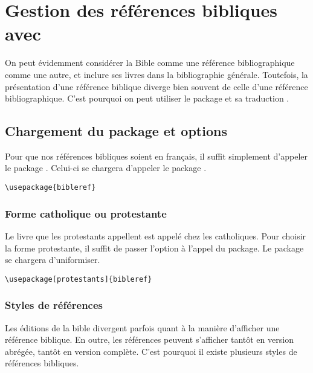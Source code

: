 \chapter{Gestion des références bibliques avec }

\begin{prealable}

On peut évidemment considérer la Bible comme une référence bibliographique comme une autre, et inclure ses livres dans la bibliographie générale.
Toutefois, la présentation d'une référence biblique diverge bien souvent de celle d'une référence bibliographique.
C'est pourquoi on peut utiliser le package  et sa traduction .
\end{prealable}


\section{Chargement du package et options}

Pour que nos références bibliques soient en français, il suffit simplement d'appeler le package . Celui-ci se chargera d'appeler le package .


\begin{verbatim}
\usepackage{bibleref}
\end{verbatim}

\subsection{Forme catholique ou protestante}
Le livre que les protestants appellent  est appelé  chez les catholiques. Pour choisir la forme protestante, il suffit de passer l'option  à l'appel du package. Le package se chargera d'uniformiser.

\begin{verbatim}
\usepackage[protestants]{bibleref}
\end{verbatim}

\subsection{Styles de références}

Les éditions de la bible divergent parfois quant à la manière d'afficher une référence biblique. En outre, les références peuvent s'afficher tantôt en version abrégée, tantôt en version complète. C'est pourquoi il existe  plusieurs styles de références bibliques. 

